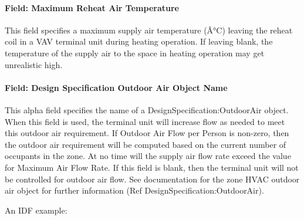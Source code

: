 \paragraph{Field: Maximum Reheat Air Temperature}\label{field-maximum-reheat-air-temperature-1}

This field specifies a maximum supply air temperature (Â°C) leaving the reheat coil in a VAV terminal unit during heating operation. If leaving blank, the temperature of the supply air to the space in heating operation may get unrealistic high.

\paragraph{Field: Design Specification Outdoor Air Object Name}\label{field-design-specification-outdoor-air-object-name}

This alpha field specifies the name of a DesignSpecification:OutdoorAir object. When this field is used, the terminal unit will increase flow as needed to meet this outdoor air requirement. If Outdoor Air Flow per Person is non-zero, then the outdoor air requirement will be computed based on the current number of occupants in the zone. At no time will the supply air flow rate exceed the value for Maximum Air Flow Rate. If this field is blank, then the terminal unit will not be controlled for outdoor air flow. See documentation for the zone HVAC outdoor air object for further information (Ref DesignSpecification:OutdoorAir).

An IDF example:

